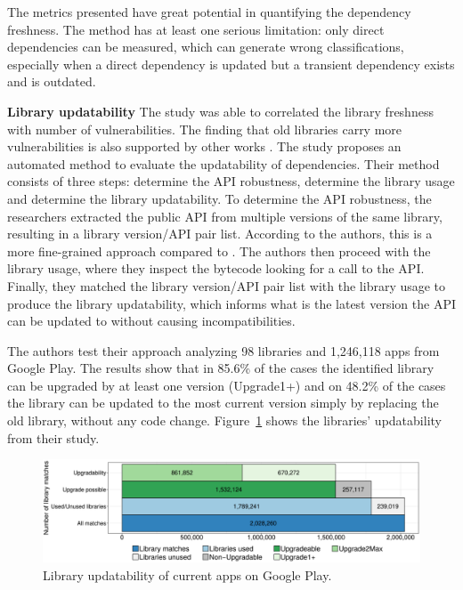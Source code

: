 \documentclass[pdf,bookmarks,colorlinks=true]{IEEEtran}
\begin{document}
The metrics presented have great potential in quantifying the dependency freshness. The method has at least one serious limitation: only direct dependencies can be measured, which can generate wrong classifications, especially when a direct dependency is updated but a transient dependency exists and is outdated.  

\textbf{Library updatability}
The study \cite{Cox2015} was able to correlated the library freshness with number of vulnerabilities. The finding that old libraries carry more vulnerabilities is also supported by other works \cite{Decan2018,Synopsys2019}. The study \cite{Derr2017} proposes an automated method to evaluate the updatability of dependencies. Their method consists of three steps: determine the API robustness, determine the library usage and determine the library updatability.
To determine the API robustness, the researchers extracted the public API from multiple versions of the same library, resulting in a library version/API pair list. According to the authors, this is a more fine-grained approach compared to \cite{Backes2016}. The authors then proceed with the library usage, where they inspect the bytecode looking for a call to the API. Finally, they matched the library version/API pair list with the library usage to produce the library updatability, which informs what is the latest version the API can be updated to without causing incompatibilities.

The authors test their approach analyzing 98 libraries and 1,246,118 apps from Google Play. The results show that in 85.6\% of the cases the identified library can be upgraded by at least one version (Upgrade1+) and on 48.2\% of the cases the library can be updated to the most current version simply by replacing the old library, without any code change. Figure~\ref{LibraryUpdatability} shows the libraries' updatability from their study.
 
\begin{figure}[h]
	\centering
	\includegraphics[scale=0.28]{LibraryUpdatability.png}
	\caption{Library updatability of current apps on Google Play.}
	\label{LibraryUpdatability}
\end{figure}
\end{document}
